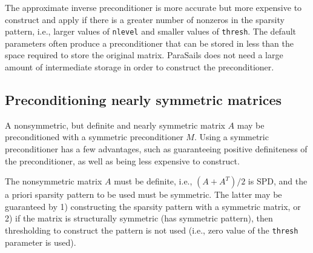 The approximate inverse preconditioner is more accurate but more expensive
to construct and apply if there is a greater number of nonzeros in the
sparsity pattern, i.e., larger
values of {\tt nlevel} and smaller values of {\tt thresh}.  The default
parameters often produce a preconditioner that can be stored in less than
the space required to store the original matrix.
ParaSails does not need a large amount of intermediate storage in
order to construct the preconditioner.

\subsection{Preconditioning nearly symmetric matrices}
\label{nearly}
A nonsymmetric, but definite and nearly symmetric matrix $A$ 
may be preconditioned
with a symmetric preconditioner $M$.  Using a symmetric preconditioner
has a few advantages, such as guaranteeing positive
definiteness of the preconditioner, as well as being less expensive
to construct.

The nonsymmetric matrix $A$ must be definite,
i.e., $(A+A^T)/2$ is SPD, and the a priori sparsity pattern to be used
must be symmetric.  The latter may be guaranteed by 1) 
constructing the sparsity pattern with a symmetric matrix, or 2) if the
matrix is structurally symmetric (has symmetric pattern), then
thresholding to construct the pattern is not used (i.e.,
zero value of the {\tt thresh} parameter is used).

